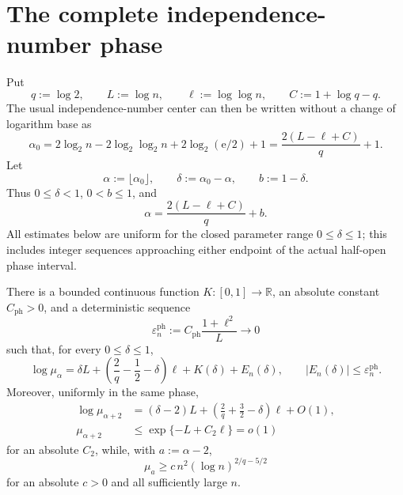 
\section{The complete independence-number phase}
\label{the-complete-independence-number-phase}

Put
\[
  q:=\log 2,
  \qquad L:=\log n,
  \qquad \ell:=\log\log n,
  \qquad C:=1+\log q-q.
\]
The usual independence-number center can then be written without a change of
logarithm base as
\begin{equation*}
  \alpha_0
  =2\log_2 n-2\log_2\log_2 n+2\log_2(\mathrm e/2)+1
  =\frac{2(L-\ell+C)}q+1.
  \tag{2.1}
\end{equation*}
Let
\[
  \alpha:=\lfloor\alpha_0\rfloor,
  \qquad
  \delta:=\alpha_0-\alpha,
  \qquad
  b:=1-\delta.
\]
Thus $0\le\delta<1$, $0<b\le1$, and
\[
  \alpha=\frac{2(L-\ell+C)}q+b.
\]
All estimates below are uniform for the closed parameter range
$0\le\delta\le1$; this includes integer sequences approaching either endpoint
of the actual half-open phase interval.

\begin{lemma}
There is a bounded continuous function $K\colon[0,1]\to\mathbb R$, an
absolute constant $C_{\mathrm{ph}}>0$, and a deterministic sequence
\[
  \varepsilon_n^{\mathrm{ph}}
  :=C_{\mathrm{ph}}\frac{1+\ell^2}{L}
  \longrightarrow0
\]
such that, for every $0\le\delta\le1$,
\begin{equation*}
  \log\mu_\alpha
  =
  \delta L
  +\left(\frac2q-\frac12-\delta\right)\ell
  +K(\delta)
  +E_n(\delta),
  \qquad
  |E_n(\delta)|\le\varepsilon_n^{\mathrm{ph}}.
  \tag{2.2}
\end{equation*}
Moreover, uniformly in the same phase,
\begin{equation*}
\begin{split}
  \log\mu_{\alpha+2}
  &=(\delta-2)L
    +\left(\frac2q+\frac32-\delta\right)\ell+O(1),\\
  \mu_{\alpha+2}
  &\le \exp\{-L+C_2\ell\}=o(1)
\end{split}
  \tag{2.3}
\end{equation*}
for an absolute $C_2$, while, with $a:=\alpha-2$,
\begin{equation*}
  \mu_a
  \ge c\,n^2(\log n)^{2/q-5/2}
  \tag{2.4}
\end{equation*}
for an absolute $c>0$ and all sufficiently large $n$.
\end{lemma}

